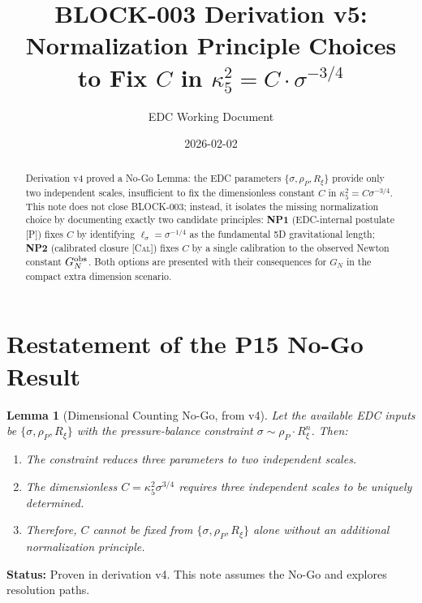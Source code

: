 \documentclass[11pt,a4paper]{article}
\title{\textbf{BLOCK-003 Derivation v5:}\\[0.3em]
Normalization Principle Choices\\
to Fix $C$ in $\kappa_5^2 = C \cdot \sigma^{-3/4}$}
\author{EDC Working Document}
\date{2026-02-02}
\newtheorem{lemma}{Lemma}
\theoremstyle{definition}
\newcommand{\Post}{\textsc{[P]}}
\newcommand{\Cal}{\textsc{[Cal]}}
\begin{document}
\maketitle

\begin{abstract}
Derivation v4 proved a No-Go Lemma: the EDC parameters $\{\sigma, \rho_P, R_\xi\}$
provide only two independent scales, insufficient to fix the dimensionless
constant $C$ in $\kappa_5^2 = C \sigma^{-3/4}$.
This note does not close BLOCK-003; instead, it isolates the missing
normalization choice by documenting exactly two candidate principles:
\textbf{NP1} (EDC-internal postulate \Post) fixes $C$ by identifying
$\ell_\sigma = \sigma^{-1/4}$ as the fundamental 5D gravitational length;
\textbf{NP2} (calibrated closure \Cal) fixes $C$ by a single calibration
to the observed Newton constant $G_N^{\rm obs}$.
Both options are presented with their consequences for $G_N$ in the
compact extra dimension scenario.
\end{abstract}

\tableofcontents
\newpage

\section{Restatement of the P15 No-Go Result}

\begin{lemma}[Dimensional Counting No-Go, from v4]
\label{lem:nogo}
Let the available EDC inputs be $\{\sigma, \rho_P, R_\xi\}$ with the
pressure-balance constraint $\sigma \sim \rho_P \cdot R_\xi^n$.
Then:
\begin{enumerate}
\item The constraint reduces three parameters to two independent scales.
\item The dimensionless $C = \kappa_5^2 \sigma^{3/4}$ requires three
independent scales to be uniquely determined.
\item Therefore, $C$ cannot be fixed from $\{\sigma, \rho_P, R_\xi\}$
alone without an additional normalization principle.
\end{enumerate}
\end{lemma}

\noindent
\textbf{Status:} Proven in derivation v4. This note assumes the No-Go
and explores resolution paths.

\end{document}
